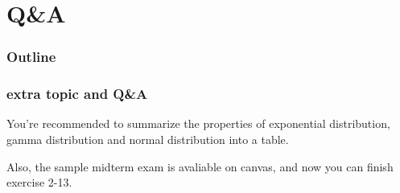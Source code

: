 \documentclass{beamer}
\begin{document}
\section{Q\&A}
\begin{frame}
    \frametitle{Outline}
    \tableofcontents[currentsection]
\end{frame}
\begin{frame}
    \frametitle{extra topic and Q\&A}
    You're recommended to summarize the properties of exponential distribution, gamma distribution and normal distribution into a table.\par
    Also, the sample midterm exam is avaliable on canvas, and now you can finish exercise 2-13.
    
\end{frame}
\end{document}
